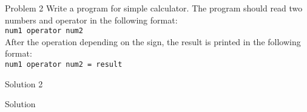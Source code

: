 \begin{frame}{Problem 2}
Write a program for simple calculator. The program should read two numbers and
operator in the following format:\\
\texttt{num1 operator num2}\\
After the operation depending on the sign, the result is printed in the
following format:\\
\texttt{num1 operator num2 = result}
\end{frame}

\begin{frame}[fragile,shrink=10]{Solution 2}
\begin{exampleblock}{Solution}

\end{exampleblock}
\end{frame}

